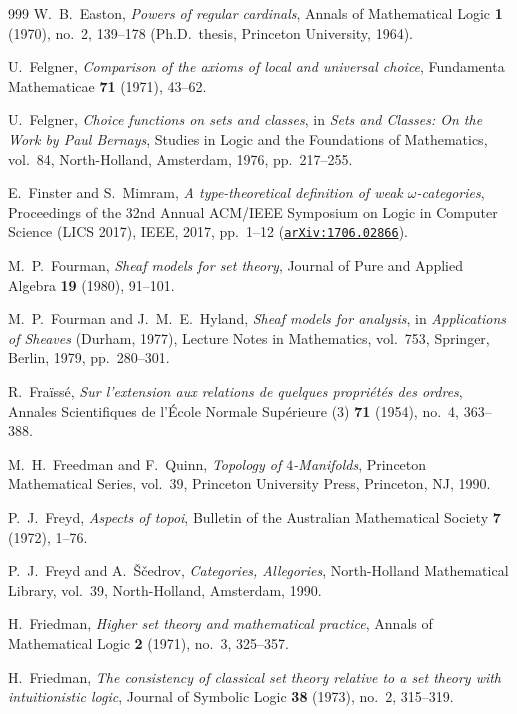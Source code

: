 \begin{thebibliography}{999}
W.~B.~Easton,
\emph{Powers of regular cardinals},
Annals of Mathematical Logic \textbf{1} (1970), no.~2, 139--178 (Ph.D.\ thesis, Princeton University, 1964).

U.~Felgner,
\emph{Comparison of the axioms of local and universal choice},
Fundamenta Mathematicae \textbf{71} (1971), 43--62.

U.~Felgner,
\emph{Choice functions on sets and classes},
in \emph{Sets and Classes: On the Work by Paul Bernays}, Studies in Logic and the Foundations of Mathematics, vol.~84, North-Holland, Amsterdam, 1976, pp.~217--255.

E.~Finster and S.~Mimram,
\emph{A type-theoretical definition of weak $\omega$-categories},
Proceedings of the 32nd Annual ACM/IEEE Symposium on Logic in Computer Science (LICS 2017), IEEE, 2017, pp.~1--12 (\href{https://arxiv.org/abs/1706.02866}{\texttt{arXiv:1706.02866}}).

M.~P.~Fourman,
\emph{Sheaf models for set theory},
Journal of Pure and Applied Algebra \textbf{19} (1980), 91--101.

M.~P.~Fourman and J.~M.~E.~Hyland,
\emph{Sheaf models for analysis},
in \emph{Applications of Sheaves} (Durham, 1977), Lecture Notes in Mathematics, vol.~753, Springer, Berlin, 1979, pp.~280--301.

R.~Fra\"iss\'e,
\emph{Sur l'extension aux relations de quelques propri\'et\'es des ordres},
Annales Scientifiques de l'\'Ecole Normale Sup\'erieure (3) \textbf{71} (1954), no.~4, 363--388.

M.~H.~Freedman and F.~Quinn,
\emph{Topology of $4$-Manifolds},
Princeton Mathematical Series, vol.~39, Princeton University Press, Princeton, NJ, 1990.

P.~J.~Freyd,
\emph{Aspects of topoi},
Bulletin of the Australian Mathematical Society \textbf{7} (1972), 1--76.

P.~J.~Freyd and A.~\v{S}\v{c}edrov,
\emph{Categories, Allegories},
North-Holland Mathematical Library, vol.~39, North-Holland, Amsterdam, 1990.

H.~Friedman,
\emph{Higher set theory and mathematical practice},
Annals of Mathematical Logic \textbf{2} (1971), no.~3, 325--357.

H.~Friedman,
\emph{The consistency of classical set theory relative to a set theory with intuitionistic logic},
Journal of Symbolic Logic \textbf{38} (1973), no.~2, 315--319.


\end{thebibliography}
